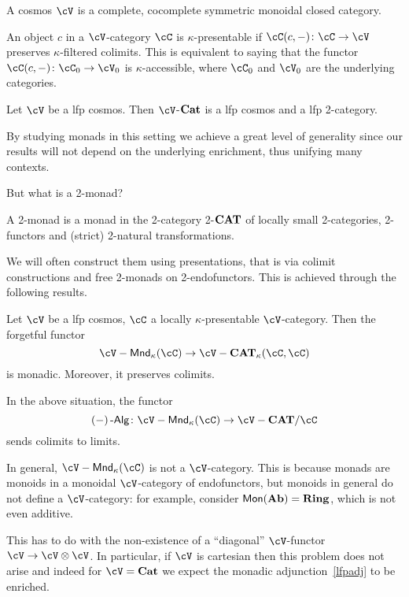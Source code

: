 \documentclass[a4paper,11pt,oneside,openany]{scrbook}
\begin{document}
\begin{defn}
    A cosmos $\cV$ is a complete, cocomplete symmetric monoidal closed category.
\end{defn}

\begin{defn}
    An object $c$ in a $\cV$-category $\cC$ is $\kappa$-presentable if
    $\cC(c,-)\colon\cC\rightarrow\cV$ preserves $\kappa$-filtered colimits. This
    is equivalent to saying that the functor
    $\cC(c,-)\colon\cC_0\rightarrow\cV_0$ is $\kappa$-accessible, where $\cC_0$
    and $\cV_0$ are the underlying categories.
\end{defn}

\begin{thm}
    Let $\cV$ be a lfp cosmos. Then $\cV$-${\normalfont\textbf{Cat}}$ is a lfp cosmos and a lfp
    2-category.
\end{thm}

By studying monads in this setting we achieve a great level of generality since
our results will not depend on the underlying enrichment, thus unifying many
contexts.

But what is a 2-monad?

\begin{defn}
    A 2-monad is a monad in the 2-category 2-${\normalfont\textbf{CAT}}$ of locally small
    2-categories, 2-functors and (strict) 2-natural transformations.
\end{defn}

We will often construct them using presentations, that is via colimit
constructions and free 2-monads on 2-endofunctors. This is achieved through the
following results.

\begin{thm}\label{lfpadj}
    Let $\cV$ be a lfp cosmos, $\cC$ a locally $\kappa$-presentable
    $\cV$-category. Then the forgetful functor
    \[
        \cV-\Mnd_\kappa(\cC)\rightarrow\cV-\CAT_\kappa(\cC,\cC)
    \]
    is monadic. Moreover, it preserves colimits.
\end{thm}

\begin{cor}
    In the above situation, the functor
    \[
        (-)\Alg\colon\cV-\Mnd_\kappa(\cC)\rightarrow\cV-\CAT/\cC
    \]
    sends colimits to limits.
\end{cor}

\begin{rmk}
    In general, $\cV-\Mnd_\kappa(\cC)$ is not a $\cV$-category. This is because
    monads are monoids in a monoidal $\cV$-category of endofunctors, but monoids
    in general do not define a $\cV$-category: for example, consider
    $\operatorname{\mathsf{Mon}}({\normalfont\textbf{Ab}})={\normalfont\textbf{Ring}}$, which is not even additive.

    This has to do with the non-existence of a ``diagonal'' $\cV$-functor
    $\cV\rightarrow\cV\otimes\cV$. In particular, if $\cV$ is cartesian then
    this problem does not arise and indeed for $\cV=\Cat$ we expect the
    monadic adjunction~\ref{lfpadj} to be enriched.
\end{rmk}
\end{document}

